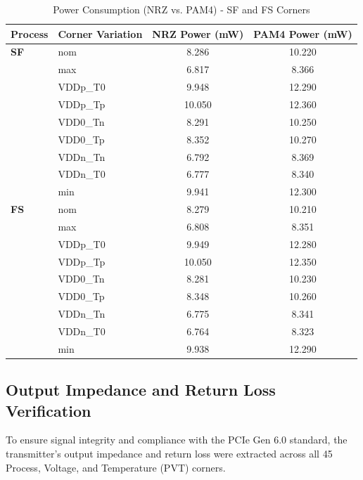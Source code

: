 \begin{table}[H]
    \centering
    \small
    \caption{Power Consumption (NRZ vs. PAM4) - SF and FS Corners}
    \label{tab:power_sf_fs}
    \renewcommand{\arraystretch}{1.1}
    \begin{tabular}{llcc}
        \toprule
        \textbf{Process} & \textbf{Corner Variation} & \textbf{NRZ Power (mW)} & \textbf{PAM4 Power (mW)} \\
        \midrule
        \textbf{SF} & nom & 8.286 & 10.220 \\
                    & max & 6.817 & 8.366 \\
                    & VDDp\_T0 & 9.948 & 12.290 \\
                    & VDDp\_Tp & 10.050 & 12.360 \\
                    & VDD0\_Tn & 8.291 & 10.250 \\
                    & VDD0\_Tp & 8.352 & 10.270 \\
                    & VDDn\_Tn & 6.792 & 8.369 \\
                    & VDDn\_T0 & 6.777 & 8.340 \\
                    & min & 9.941 & 12.300 \\
        \midrule
        \textbf{FS} & nom & 8.279 & 10.210 \\
                    & max & 6.808 & 8.351 \\
                    & VDDp\_T0 & 9.949 & 12.280 \\
                    & VDDp\_Tp & 10.050 & 12.350 \\
                    & VDD0\_Tn & 8.281 & 10.230 \\
                    & VDD0\_Tp & 8.348 & 10.260 \\
                    & VDDn\_Tn & 6.775 & 8.341 \\
                    & VDDn\_T0 & 6.764 & 8.323 \\
                    & min & 9.938 & 12.290 \\
        \bottomrule
    \end{tabular}
\end{table}

\newpage
\subsection{Output Impedance and Return Loss Verification}
To ensure signal integrity and compliance with the PCIe Gen 6.0 standard, the transmitter's output impedance and return loss were extracted across all 45 Process, Voltage, and Temperature (PVT) corners. 

